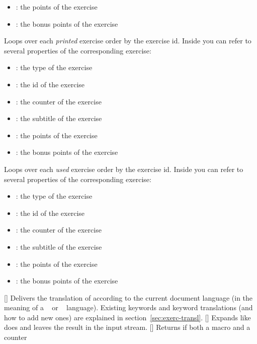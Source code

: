 \documentclass{xsim-manual}
\begin{document}
\begin{commands}
\begin{itemize}
      \item {}: the points of the exercise
      \item {}: the bonus points of the exercise
    \end{itemize}
    Loops over each \emph{printed} exercise order by the exercise id.  Inside
     you can refer to several properties of the corresponding
    exercise:
    \begin{itemize}
      \item {}: the type of the exercise
      \item {}: the id of the exercise
      \item {}: the counter of the exercise
      \item {}: the subtitle of the exercise
      \item {}: the points of the exercise
      \item {}: the bonus points of the exercise
    \end{itemize}
    Loops over each \emph{used} exercise order by the exercise id.  Inside
     you can refer to several properties of the corresponding
    exercise:
    \begin{itemize}
      \item {}: the type of the exercise
      \item {}: the id of the exercise
      \item {}: the counter of the exercise
      \item {}: the subtitle of the exercise
      \item {}: the points of the exercise
      \item {}: the bonus points of the exercise
    \end{itemize}
  \expandable{}[]
    Delivers the translation of  according to the current
    document language (in the meaning of a ~\cite{pkg:babel} or
    ~\cite{pkg:polyglossia} language).  Existing keywords and
    keyword translations (and how to add new ones) are explained in
    section~\vref{sec:exerc-transl}.
  []
    Expands  like  does and leaves the result in the
    input stream.
  \expandable{}[]
    Returns  if both a macro  and a counter

\end{commands}
\end{document}
